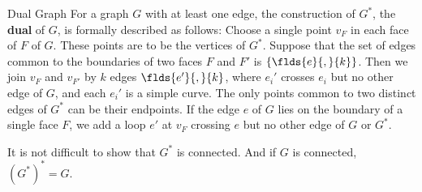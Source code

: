 \documentclass[a4paper,10pt]{article}
\renewcommand{\vocab}[1]{\textbf{#1}}
\begin{document}
\begin{definition}[def:]{Dual Graph}
  For a graph $G$ with at least one edge, the construction of $G^*$, the \vocab{dual} of $G$, is formally described as follows: Choose a single point $v_F$ in each face of $F$ of $G$. These points are to be the vertices of $G^*$. Suppose that the set of edges common to the boundaries of two faces $F$ and $F'$ is $\left\{\flds{e}{,}{k}\right\}$. Then we join $v_F$ and $v_{F'}$ by $k$ edges $\flds{e'}{,}{k}$, where $e_i'$ crosses $e_i$ but no other edge of $G$, and each $e_i'$ is a simple curve. The only points common to two distinct edges of $G^*$ can be their endpoints. If the edge $e$ of $G$ lies on the boundary of a single face $F$, we add a loop $e'$ at $v_F$ crossing $e$ but no other edge of $G$ or $G^*$.
  \begin{remark}
    It is not difficult to show that $G^*$ is connected. And if $G$ is connected, $(G^*)^*=G$.
  \end{remark}
\end{definition}
\end{document}
